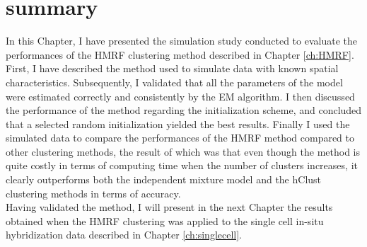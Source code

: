 \section{summary}
In this Chapter, I have presented the simulation study conducted to evaluate the performances of the HMRF clustering method described in Chapter \ref{ch:HMRF}. First, I have described the method used to simulate data with known spatial characteristics. Subsequently, I validated that all the parameters of the model were estimated correctly and consistently by the EM algorithm. I then discussed the performance of the method regarding the initialization scheme, and concluded that a selected random initialization yielded the best results. Finally I used the simulated data to compare the performances of the HMRF method compared to other clustering methods, the result of which was that even though the method is quite costly in terms of computing time when the number of clusters increases, it clearly outperforms both the independent mixture model and the hClust clustering methods in terms of accuracy.\\

Having validated the method, I will present in the next Chapter the results obtained when the HMRF clustering was applied to the single cell in-situ hybridization data described in Chapter \ref{ch:singlecell}.


